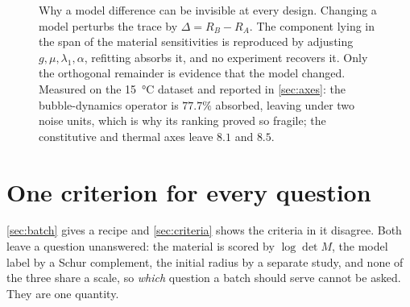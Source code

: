 \documentclass[10pt]{article}
\begin{document}
\begin{figure}[t]
\centering
{}
\caption{Why a model difference can be invisible at every design. Changing a model perturbs
the trace by $\Delta = R_B - R_A$. The component lying in the span of the material
sensitivities is reproduced by adjusting $g,\mu,\lambda_1,\alpha$, refitting absorbs it, and
no experiment recovers it. Only the orthogonal remainder is evidence that the model changed.
Measured on the \SI{15}{\celsius} dataset and reported in \cref{sec:axes}: the bubble-dynamics
operator is $77.7\%$ absorbed, leaving under two noise units, which is why its ranking proved
so fragile; the constitutive and thermal axes leave $8.1$ and $8.5$.}
\label{fig:absorption}
\end{figure}

\section{One criterion for every question}
\label{sec:gain}

\cref{sec:batch} gives a recipe and \cref{sec:criteria} shows the criteria in it disagree.
Both leave a question unanswered: the material is scored by $\log\det M$, the model label by a
Schur complement, the initial radius by a separate study, and none of the three share a scale,
so \emph{which} question a batch should serve cannot be asked. They are one quantity.
\end{document}
